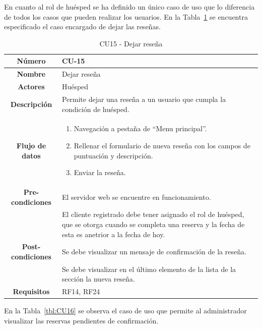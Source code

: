 En cuanto al rol de huésped se ha definido un único caso de uso que lo diferencia de todos los casos que pueden realizar los usuarios. En la Tabla~\ref{tbl:CU15} se encuentra especificado el caso encargado de dejar las reseñas.
\begin{table}[h!tb]
	\centering
	\begin{adjustbox}{width=1\textwidth}
	\begin{tabular}{|c|p{\textwidth}|}
		\hline {\bf Número} & CU-15 \\
		\hline {\bf Nombre} & Dejar reseña\\
		\hline {\bf Actores} & Huésped \\
		\hline {\bf Descripción} & Permite dejar una reseña a un usuario que cumpla la condición de huésped. \\
		\hline {\bf Flujo de datos}
		& 
		\begin{enumerate}
			\item Navegación a pestaña de ``Menu principal''.
            \item Rellenar el formulario de nueva reseña con los campos de puntuación y descripción.
            \item Enviar la reseña.
           
        \end{enumerate}\\
		\hline {\bf Pre-condiciones}
		& El servidor web se encuentre en funcionamiento. \\
        & El cliente registrado debe tener asignado el rol de huésped, que se otorga cuando se completa una reserva y la fecha de esta es anetrior a la fecha de hoy. \\
		\hline {\bf Post-condiciones}
		& Se debe visualizar un mensaje de confirmación de la reseña. \\
        & Se debe visualizar en el último elemento de la lista de la sección la nueva reseña.\\
		\hline {\bf Requisitos} & RF14, RF24 \\
		\hline 
	\end{tabular}
	\end{adjustbox}
	\caption{CU15 - Dejar reseña\label{tbl:CU15}}
\end{table}
En la Tabla~\ref{tbl:CU16} se observa el caso de uso que permite al administrador visualizar las reservas pendientes de confirmación.
